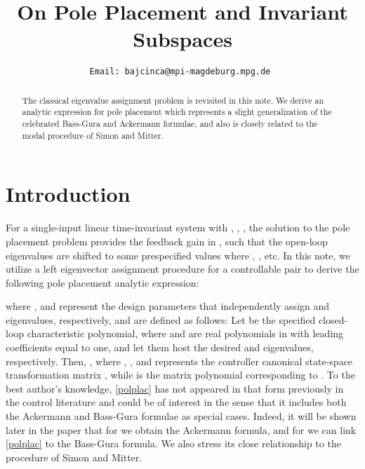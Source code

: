\documentclass[conference]{IEEEtran}
\begin{document}
\title{On Pole Placement and Invariant Subspaces}




\author{
\tt\small Email:  bajcinca@mpi-magdeburg.mpg.de\vspace{-12pt}
}




\maketitle



\begin{abstract}
The classical eigenvalue assignment problem is revisited in this
note. We derive an analytic expression for pole placement
which represents a slight generalization of the celebrated Bass-Gura and Ackermann formulae, and also is closely related to the modal procedure of Simon and Mitter.
\end{abstract}
\IEEEpeerreviewmaketitle

\vspace{-5pt}
\section{Introduction}
\label{Introduction}
\vspace{-2pt}


For a single-input linear time-invariant system
 with ,
,  , the
solution to the pole placement problem provides the feedback gain  in ,
such that the open-loop eigenvalues  are shifted to
some prespecified values  where ,
\cite{Kailat80, Ackermann:1972vl, SimMit68}, etc. In this note, we
utilize a left eigenvector assignment procedure for a
controllable pair  to derive the following pole placement analytic expression:

where ,  and
 represent the design
parameters that independently assign  and  eigenvalues,
respectively, and are defined as follows: Let
 be the specified closed-loop
characteristic polynomial, where  and
 are real polynomials in  with leading
coefficients equal to one, and let them host the desired  and 
eigenvalues, respectively. Then, ,
where ,
,
and  represents the controller canonical state-space
transformation matrix \cite{Kailat80}, while  is the matrix polynomial corresponding to .
To the best author's knowledge, \eqref{polplac} has
not appeared in that form previously in the control literature and
could be of interest in the sense that it includes both the Ackermann
and Bass-Gura formulae as special cases. Indeed, it will be shown
later in the paper that for  we obtain
the Ackermann formula,
and for  we can link \eqref{polplac} to the Bass-Gura formula. We also
stress its close relationship to the procedure of Simon and
Mitter.
\end{document}
